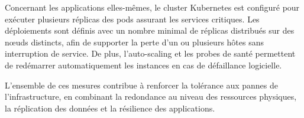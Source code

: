 Concernant les applications elles-mêmes, le cluster Kubernetes est configuré pour exécuter plusieurs réplicas des pods assurant les services critiques. Les déploiements sont définis avec un nombre minimal de réplicas distribués sur des nœuds distincts, afin de supporter la perte d’un ou plusieurs hôtes sans interruption de service. De plus, l’auto-scaling et les probes de santé permettent de redémarrer automatiquement les instances en cas de défaillance logicielle.

L’ensemble de ces mesures contribue à renforcer la tolérance aux pannes de l’infrastructure, en combinant la redondance au niveau des ressources physiques, la réplication des données et la résilience des applications.

